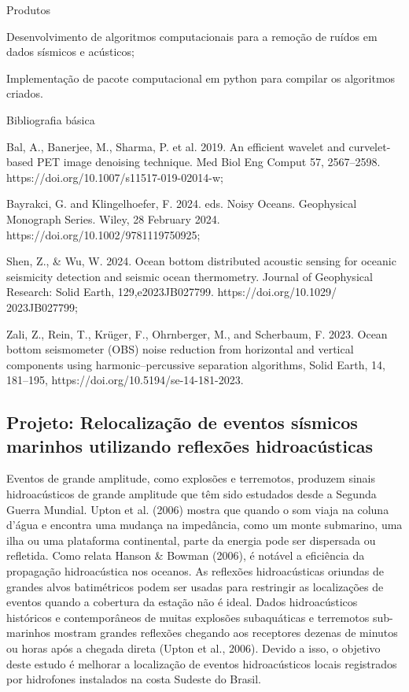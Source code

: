\documentclass[10pt,a4paper,oneside]{book}
\begin{document}
\begin{fancyenum}{\faShoppingCart}{Produtos}
	\item Desenvolvimento de algoritmos computacionais para a remoção de ruídos em dados sísmicos e acústicos;
	\item Implementação de pacote computacional em python para compilar os algoritmos criados.
\end{fancyenum}

\begin{fancyenum}{\faBook}{Bibliografia básica}
	\item Bal, A., Banerjee, M., Sharma, P. et al. 2019. An efficient wavelet and curvelet-based PET image denoising technique. Med Biol Eng Comput 57, 2567–2598. https://doi.org/10.1007/s11517-019-02014-w;
	\item Bayrakci, G. and Klingelhoefer, F. 2024. eds. Noisy Oceans. Geophysical Monograph Series. Wiley, 28 February 2024. https://doi.org/10.1002/9781119750925;
	\item Shen, Z., \& Wu, W. 2024. Ocean bottom distributed acoustic sensing for oceanic seismicity detection and seismic ocean thermometry. Journal of Geophysical Research: Solid Earth, 129,e2023JB027799. https://doi.org/10.1029/
2023JB027799;
	\item Zali, Z., Rein, T., Krüger, F., Ohrnberger, M., and Scherbaum, F. 2023. Ocean bottom seismometer (OBS) noise reduction from horizontal and vertical components using harmonic–percussive separation algorithms, Solid Earth, 14, 181–195, https://doi.org/10.5194/se-14-181-2023.
\end{fancyenum}

\subsection{Projeto: Relocalização de eventos sísmicos marinhos utilizando reflexões hidroacústicas}

Eventos de grande amplitude, como explosões e terremotos, produzem sinais hidroacústicos de grande amplitude que têm sido estudados desde a Segunda Guerra Mundial. Upton et al. (2006) mostra que quando o som viaja na coluna d'água e encontra uma mudança na impedância, como um monte submarino, uma ilha ou uma plataforma continental, parte da energia pode ser dispersada ou refletida. Como relata Hanson \& Bowman (2006), é notável a eficiência da propagação hidroacústica nos oceanos. As reflexões hidroacústicas oriundas de grandes alvos batimétricos podem ser usadas para restringir as localizações de eventos quando a cobertura da estação não é ideal. Dados hidroacústicos históricos e contemporâneos de muitas explosões subaquáticas e terremotos sub-marinhos mostram grandes reflexões chegando aos receptores dezenas de minutos ou horas após a chegada direta (Upton et al., 2006). Devido a isso, o objetivo deste estudo é melhorar a localização de eventos hidroacústicos locais registrados por hidrofones instalados na costa Sudeste do Brasil. 
\end{document}
